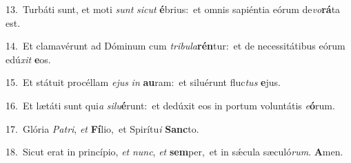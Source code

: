 {\numbfont\textcolor{\numbcolor}{13.}}~Turbáti sunt, et moti \textit{sunt} \textit{sic}\-\textit{ut} \textbf{é}\-brius:~\star et omnis sapiéntia eórum de\-\textit{vo}\-\textbf{rá}ta est.\par
{\numbfont\textcolor{\numbcolor}{14.}}~Et clamavérunt ad Dóminum cum \textit{tri}\-\textit{bu}\textit{la}\textbf{rén}tur:~\star et de necessitátibus eórum edú\textit{xit} \textbf{e}\-os.\par
{\numbfont\textcolor{\numbcolor}{15.}}~Et státuit procéllam \textit{e}\-\textit{jus} \textit{in} \textbf{au}\-ram:~\star et siluérunt fluc\textit{tus} \textbf{e}\-jus.\par
{\numbfont\textcolor{\numbcolor}{16.}}~Et lætáti sunt qui\textit{a} \textit{si}\-\textit{lu}\textbf{é}runt:~\star et dedúxit eos in portum voluntátis \textit{e}\-\textbf{ó}rum.\par
{\numbfont\textcolor{\numbcolor}{17.}}~Glória \textit{Pa}\-\textit{tri}, \textit{et} \textbf{Fí}\-lio,~\star et Spirítu\textit{i} \textbf{Sanc}\-to.\par
{\numbfont\textcolor{\numbcolor}{18.}}~Sicut erat in princípio, \textit{et} \textit{nunc}\-, \textit{et} \textbf{sem}\-per,~\star et in sǽcula sæculó\-\textit{rum}\-. \textbf{A}\-men.\par
